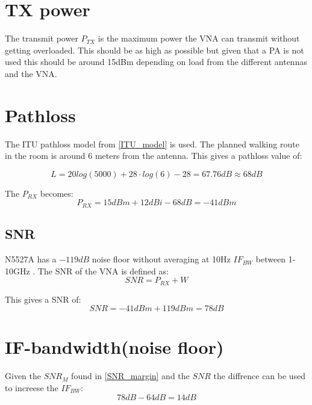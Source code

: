 

\section{TX power}
The transmit power $P_{TX}$ is the maximum power the VNA can transmit without getting overloaded. This should be as high as possible but given that a \gls{PA} is not used this should be around 15dBm \citep{Key_PNA} depending on load from the different antennas and the VNA.
\section{Pathloss}
The ITU pathloss model from \autoref{ITU_model} is used. The planned walking route in the room is around 6 meters from the antenna. This gives a pathloss value of:


\begin{equation}
L = 20log (5000) + 28 \cdot log(6)-28 = 67.76dB \approx 68dB
\label{eq:path_loss}
\end{equation}

The $P_{RX}$ becomes:
\begin{equation}
P_{RX} = 15dBm + 12dBi - 68dB = -41dBm
\label{NFvna}
\end{equation}
\subsection{SNR}
 N5527A has a $-119dB$ noise floor without averaging at 10Hz $IF_{BW}$ between 1-10GHz \citep{Key_PNA}. The \gls{SNR} of the VNA  is defined as:
\begin{equation}
SNR = P_{RX}+W
\end{equation}

\begin{where}
\end{where}

This gives a SNR of:
\begin{equation}
SNR = -41dBm+119dBm = 78dB
\end{equation}


\section{IF-bandwidth(noise floor)}
Given the $SNR_{M}$ found in \autoref{SNR_margin} and the $SNR$ the diffrence can be used to increese the $IF_{BW}$:
\begin{equation}
  78dB-64dB = 14dB 
\end{equation}


